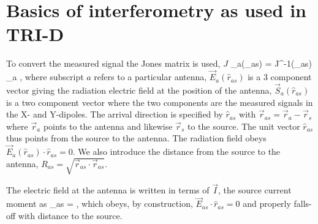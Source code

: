 \section{Basics of interferometry as used in TRI-D}

To convert the measured signal the Jones matrix is used, $J$
\beq
{}_a(_{as}) = J^{-1}(_{as}) _a \;,
\eeq
where subscript $a$ refers to a particular antenna, $\vec{E}_a(\hat{r}_{as})$ is a 3 component vector giving the radiation electric field at the position of the antenna, $ \vec{S}_a(\hat{r}_{as})$ is a two component vector where the two components are the measured signals in the X- and Y-dipoles. The arrival direction is specified by $\hat{r}_{as}$ with $\vec{r}_{as}=\vec{r}_a-\vec{r}_s$ where $\vec{r}_a$ points to the antenna and likewise $\vec{r}_s$ to the source. The unit vector  $\hat{r}_{as}$ thus points from the source to the antenna. The radiation field obeys  $\vec{E}_a(\hat{r}_{as}) \cdot \hat{r}_{as}=0$. We also introduce the distance from the source to the antenna, $R_{as}=\sqrt{\vec{r}_{as} \cdot \vec{r}_{as}}$.

The electric field at the antenna is written in terms of $\vec{I}$, the source current moment as
\beq
{}_{as} =  \;, 
\eeq
which obeys, by construction, $\vec{E}_{as} \cdot \hat{r}_{as}=0$ and properly falls-off with distance to the source.

